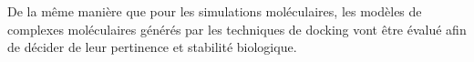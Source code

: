 



 \label{docking_eval}

De la même manière que pour les simulations moléculaires, les modèles de complexes moléculaires générés par les techniques de docking vont être évalué afin de décider de leur pertinence et stabilité biologique.

